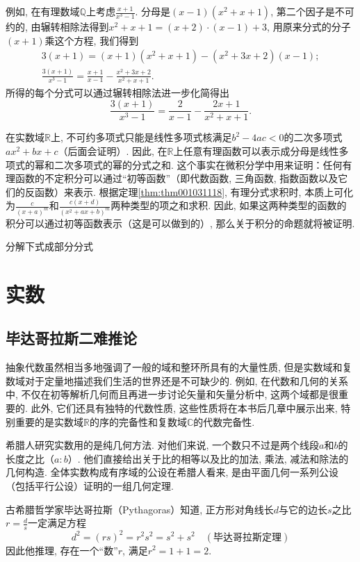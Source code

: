 例如, 在有理数域$\mathbb{Q}$上考虑$\frac{x+1}{x^3-1}$. 分母是$(x-1)(x^2+x+1)$, 第二个因子是不可约的, 由辗转相除法得到$x^2+x+1 = (x+2) \cdot (x-1) + 3$, 用原来分式的分子$(x+1)$乘这个方程, 我们得到
\begin{gather*}
3(x+1) = (x+1)(x^2+x+1)- (x^2 + 3x + 2)(x-1);\\
\frac{3(x+1)}{x^3-1} = \frac{x+1}{x-1} - \frac{x^2+3x+2}{x^2+x+1}.
\end{gather*}
所得的每个分式可以通过辗转相除法进一步化简得出
\[
\frac{3(x+1)}{x^3-1} = \frac{2}{x-1} - \frac{2x+1}{x^2+x+1}.
\]

在实数域$\mathbb{R}$上, 不可约多项式只能是线性多项式核满足$b^2-4ac<0$的二次多项式$ax^2+bx+c$（后面会证明）. 因此, 在$\mathbb{R}$上任意有理函数可以表示成分母是线性多项式的幂和二次多项式的幂的分式之和. 这个事实在微积分学中用来证明：任何有理函数的不定积分可以通过“初等函数”（即代数函数, 三角函数, 指数函数以及它们的反函数）来表示. 根据定理\ref{thm:thm001031118}, 有理分式求积时, 本质上可化为$\frac{c}{(x+a)^m}$和$\frac{c(x+d)}{(x^2+ax+b)^m}$两种类型的项之和求积. 因此, 如果这两种类型的函数的积分可以通过初等函数表示（这是可以做到的）, 那么关于积分的命题就将被证明. 

\begin{problem}
分解下式成部分分式
\end{problem}


\chapter{实数}\label{section00104}

\section{毕达哥拉斯二难推论}\label{subsection0010401}
抽象代数虽然相当多地强调了一般的域和整环所具有的大量性质, 但是实数域和复数域对于定量地描述我们生活的世界还是不可缺少的. 例如, 在代数和几何的关系中, 不仅在初等解析几何而且再进一步讨论矢量和矢量分析中, 这两个域都是很重要的. 此外, 它们还具有独特的代数性质, 这些性质将在本书后几章中展示出来, 特别重要的是实数域$\mathbb{R}$的序的完备性和复数域$\mathbb{C}$的代数完备性. 

希腊人研究实数用的是纯几何方法. 对他们来说, 一个数只不过是两个线段$a$和$b$的长度之比（$a:b$）. 他们直接给出关于比的相等以及比的加法, 乘法, 减法和除法的几何构造. 全体实数构成有序域的公设在希腊人看来, 是由平面几何一系列公设（包括平行公设）证明的一组几何定理. 

古希腊哲学家毕达哥拉斯（Pythagoras）知道, 正方形对角线长$d$与它的边长$s$之比$r = \frac{d}{s}$一定满足方程
\begin{equation}\label{equ001040101}
d^2 = (rs)^2 = r^2s^2 = s^2 + s^2 \quad (\text{毕达哥拉斯定理})
\end{equation}
因此他推理, 存在一个“数”$r$, 满足$r^2 = 1 + 1 = 2$. 

